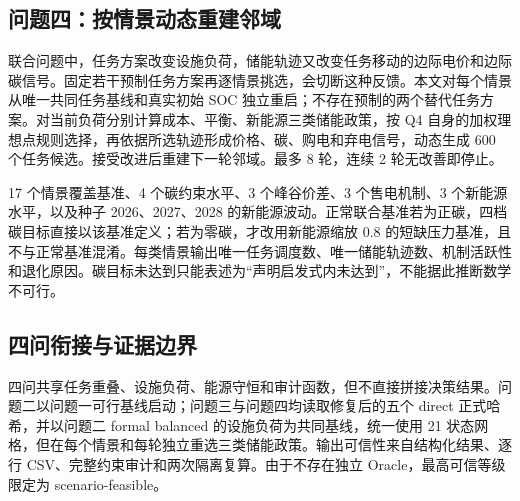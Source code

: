 \subsection{问题四：按情景动态重建邻域}
联合问题中，任务方案改变设施负荷，储能轨迹又改变任务移动的边际电价和边际碳信号。固定若干预制任务方案再逐情景挑选，会切断这种反馈。本文对每个情景从唯一共同任务基线和真实初始 SOC 独立重启；不存在预制的两个替代任务方案。对当前负荷分别计算成本、平衡、新能源三类储能政策，按 Q4 自身的加权理想点规则选择，再依据所选轨迹形成价格、碳、购电和弃电信号，动态生成 600 个任务候选。接受改进后重建下一轮邻域。最多 8 轮，连续 2 轮无改善即停止。

17 个情景覆盖基准、4 个碳约束水平、3 个峰谷价差、3 个售电机制、3 个新能源水平，以及种子 2026、2027、2028 的新能源波动。正常联合基准若为正碳，四档碳目标直接以该基准定义；若为零碳，才改用新能源缩放 0.8 的短缺压力基准，且不与正常基准混淆。每类情景输出唯一任务调度数、唯一储能轨迹数、机制活跃性和退化原因。碳目标未达到只能表述为“声明启发式内未达到”，不能据此推断数学不可行。

\subsection{四问衔接与证据边界}
四问共享任务重叠、设施负荷、能源守恒和审计函数，但不直接拼接决策结果。问题二以问题一可行基线启动；问题三与问题四均读取修复后的五个 direct 正式哈希，并以问题二 formal balanced 的设施负荷为共同基线，统一使用 21 状态网格，但在每个情景和每轮独立重选三类储能政策。输出可信性来自结构化结果、逐行 CSV、完整约束审计和两次隔离复算。由于不存在独立 Oracle，最高可信等级限定为 scenario-feasible。
